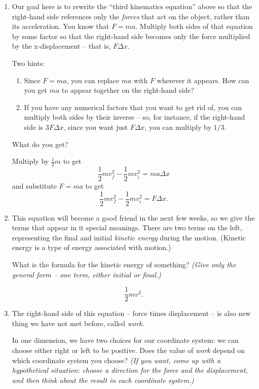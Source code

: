 \documentclass[12pt]{article}
\begin{document}
\begin{enumerate}
	\item Our goal here is to rewrite the ``third kinematics equation'' above so that the right-hand side references only the {\it forces} that act on the object, rather than its acceleration. You know that $F=ma$. Multiply both sides of that equation by some factor so that the right-hand side becomes only the force multiplied by the x-displacement -- that is, $F \Delta x$.
	
	Two hints:
	
	\begin{enumerate}
		\item Since $F=ma$, you can replace $ma$ with $F$ wherever it appears. How can you get $ma$ to appear together on the right-hand side?
		\item If you have any numerical factors that you want to get rid of, you can multiply both sides by their inverse -- so, for instance, if the right-hand side is $3 F \Delta x$, since you want just $F \Delta x$, you can multiply by $1/3$.
	\end{enumerate}
	
	
	 What do you get? 
	
{\color{Red} Multiply by $\frac{1}{2}m$ to get $$\frac{1}{2}mv_f^2 - \frac{1}{2}mv_i^2 = ma \Delta x$$ and substitute $F=ma$ to get $$\frac{1}{2}mv_f^2 - \frac{1}{2}mv_i^2 = F \Delta x.$$}
	

	\item This equation will become a good friend in the next few weeks, so we give the terms that appear in it special meanings. There are two terms on the left, representing the final and initial {\it kinetic energy} during the motion. (Kinetic energy is a type of energy associated with motion.)
	
	What is the formula for the kinetic energy of something? {\it (Give only the general form -- one term, either initial or final.)}
	
{\color{Red} $$\frac{1}{2}mv^2.$$}
	
	\item The right-hand side of this equation -- force times displacement -- is also new thing we have not met before, called {\it work}. 
	
	In one dimension, we have two choices for our coordinate system: we can choose either right or left to be positive. Does the value of {\it work} depend on which coordinate system you choose? {\it (If you want, come up with a hypothetical situation: choose a direction for the force and the displacement, and then think about the result in each coordinate system.)}
	

\end{enumerate}
\end{document}
